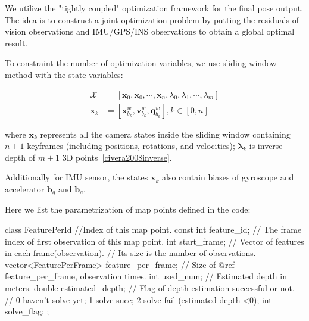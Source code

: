 \documentclass[12pt]{report}   %
\begin{document}
We utilize the "tightly coupled" optimization framework for the final pose output. The idea is to construct a joint optimization problem by putting the residuals of vision observations and IMU/GPS/INS observations to obtain a global optimal result.

To constraint the number of optimization variables, we use sliding window method with the state variables:


\begin{equation}
\begin{aligned}
\mathbf{\mathcal{X}} &= \left[  \mathbf{x}_0, \mathbf{x}_0, \cdots, \mathbf{x}_n, \lambda_0, \lambda_1, \cdots, \lambda_m  \right] \\
\mathbf{x}_k &= \left[  \mathbf{x}_{b_k}^w, \mathbf{v}_{b_k}^w, \mathbf{q}_{b_k}^w  \right], k\in{[0, n]} 
\end{aligned} \label{states}
\end{equation}

where $\mathbf{x}_k$ represents all the camera states inside the sliding window containing $n+1$ keyframes (including positions, rotations, and velocities); $\mathbf{\lambda}_k$ is inverse depth of $m+1$ 3D points~\ref{civera2008inverse}.

Additionally for IMU sensor, the states $\mathbf{x}_k$ also contain biases of gyroscope and accelerator $\mathbf{b}_g$ and $\mathbf{b}_a$.


Here we list the parametrization of map points defined in the code:

\begin{cppcode}
class FeaturePerId {
//Index of this map point.
const int feature_id;
// The frame index of first observation of this map point.
int start_frame;
// Vector of features in each frame(observation). 
// Its size is the number of observations.
vector<FeaturePerFrame> feature_per_frame;
// Size of @ref feature\_per\_frame, observation times.
int used_num;
// Estimated depth in meters.
double estimated_depth;
// Flag of depth estimation successful or not.
// 0 haven't solve yet; 1 solve succ; 2 solve fail (estimated depth <0);
int solve_flag;
};
\end{cppcode}
\end{document}
